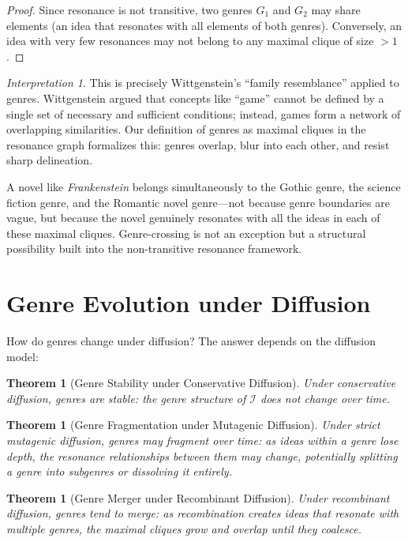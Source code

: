\documentclass[11pt,openany]{book}
\theoremstyle{definition}
\theoremstyle{plain}
\newtheorem{theorem}[axiom]{Theorem}
\theoremstyle{remark}
\newtheorem{interpretation}[axiom]{Interpretation}
\newcommand{\IS}{\mathcal{I}}               %
\begin{document}
\begin{proof}
Since resonance is not transitive, two genres $G_1$ and $G_2$ may share elements (an idea that resonates with all elements of both genres). Conversely, an idea with very few resonances may not belong to any maximal clique of size $> 1$.
\end{proof}

\begin{interpretation}
This is precisely Wittgenstein's ``family resemblance'' applied to genres. Wittgenstein argued that concepts like ``game'' cannot be defined by a single set of necessary and sufficient conditions; instead, games form a network of overlapping similarities. Our definition of genres as maximal cliques in the resonance graph formalizes this: genres overlap, blur into each other, and resist sharp delineation.

A novel like \emph{Frankenstein} belongs simultaneously to the Gothic genre, the science fiction genre, and the Romantic novel genre---not because genre boundaries are vague, but because the novel genuinely resonates with all the ideas in each of these maximal cliques. Genre-crossing is not an exception but a structural possibility built into the non-transitive resonance framework.
\end{interpretation}

\section{Genre Evolution under Diffusion}

How do genres change under diffusion? The answer depends on the diffusion model:

\begin{theorem}[Genre Stability under Conservative Diffusion]
Under conservative diffusion, genres are stable: the genre structure of $\IS$ does not change over time.
\end{theorem}

\begin{theorem}[Genre Fragmentation under Mutagenic Diffusion]
Under strict mutagenic diffusion, genres may fragment over time: as ideas within a genre lose depth, the resonance relationships between them may change, potentially splitting a genre into subgenres or dissolving it entirely.
\end{theorem}

\begin{theorem}[Genre Merger under Recombinant Diffusion]
Under recombinant diffusion, genres tend to merge: as recombination creates ideas that resonate with multiple genres, the maximal cliques grow and overlap until they coalesce.
\end{theorem}
\end{document}
